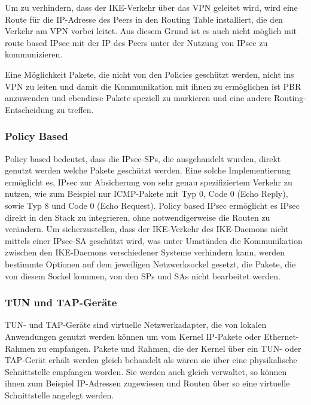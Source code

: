 Um zu verhindern, dass der \ac{IKE}-Verkehr über das \ac{VPN} geleitet wird, wird
eine Route für die \ac{IP}-Adresse des Peers in den Routing Table installiert,
die den Verkehr am \ac{VPN} vorbei leitet. Aus diesem Grund ist es auch nicht möglich
mit route based \ac{IPsec} mit der \ac{IP} des Peers unter der Nutzung von \ac{IPsec} zu kommunizieren.

Eine Möglichkeit Pakete, die nicht von den Policies geschützt werden, nicht ins \ac{VPN} zu leiten und
damit die Kommunikation mit ihnen zu ermöglichen ist \ac{PBR} anzuwenden und ebendiese Pakete
speziell zu markieren und eine andere Routing-Entscheidung zu treffen.

\subsubsection{Policy Based}
\label{subsec:policybased}
Policy based bedeutet, dass die \ac{IPsec}-\acp{SP}, die ausgehandelt wurden, direkt genutzt werden welche Pakete geschützt werden.
Eine solche Implementierung ermöglicht es, \ac{IPsec} zur Absicherung von sehr genau spezifiziertem
Verkehr zu nutzen, wie zum Beispiel nur \ac{ICMP}-Pakete mit Typ 0, Code 0 (Echo Reply), sowie Typ 8 und Code 0 (Echo Request).
Policy based \ac{IPsec} ermöglicht es \ac{IPsec} direkt in den Stack zu integrieren, ohne notwendigerweise die Routen zu verändern.
Um sicherzustellen, dass der \ac{IKE}-Verkehr des \ac{IKE}-Daemons nicht mittels einer \ac{IPsec}-\ac{SA} geschützt wird, was
unter Umständen die Kommunikation zwischen den \ac{IKE}-Daemons verschiedener Systeme verhindern kann, werden bestimmte
Optionen auf dem jeweiligen Netzwerksockel gesetzt, die Pakete, die von diesem Sockel kommen, von den \acp{SP} und \acp{SA}
nicht bearbeitet werden.



\subsubsection{TUN und TAP-Geräte}
TUN- und TAP-Geräte sind virtuelle Netzwerkadapter, die von lokalen Anwendungen
genutzt werden können um vom Kernel \ac{IP}-Pakete oder Ethernet-Rahmen zu empfangen.
Pakete und Rahmen, die der Kernel über ein TUN- oder TAP-Gerät erhält
werden gleich behandelt als wären sie über eine physikalische Schnittstelle empfangen worden.
Sie werden auch gleich verwaltet, so können ihnen zum Beispiel \ac{IP}-Adressen zugewiesen
und Routen über so eine virtuelle Schnittstelle angelegt werden.


